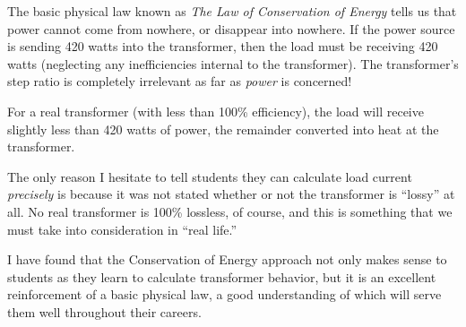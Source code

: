 
The basic physical law known as {\it The Law of Conservation of Energy} tells us that power cannot come from nowhere, or disappear into nowhere.  If the power source is sending 420 watts into the transformer, then the load must be receiving 420 watts (neglecting any inefficiencies internal to the transformer).  The transformer's step ratio is completely irrelevant as far as {\it power} is concerned!

\vskip 10pt

For a real transformer (with less than 100\% efficiency), the load will receive slightly less than 420 watts of power, the remainder converted into heat at the transformer.







The only reason I hesitate to tell students they can calculate load current {\it precisely} is because it was not stated whether or not the transformer is ``lossy'' at all.  No real transformer is 100\% lossless, of course, and this is something that we must take into consideration in ``real life.''

I have found that the Conservation of Energy approach not only makes sense to students as they learn to calculate transformer behavior, but it is an excellent reinforcement of a basic physical law, a good understanding of which will serve them well throughout their careers.




